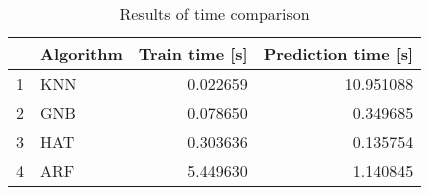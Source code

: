 \begin{table}
\footnotesize
\caption{Results of time comparison}
\label{tab:time comparison}
\begin{tabular}{llrr}
\hline
 & Algorithm & Train time [s] & Prediction time [s] \\
\hline
1 & KNN & 0.022659 & 10.951088 \\
2 & GNB & 0.078650 & 0.349685 \\
3 & HAT & 0.303636 & 0.135754 \\
4 & ARF & 5.449630 & 1.140845 \\
\hline
\end{tabular}
\end{table}
